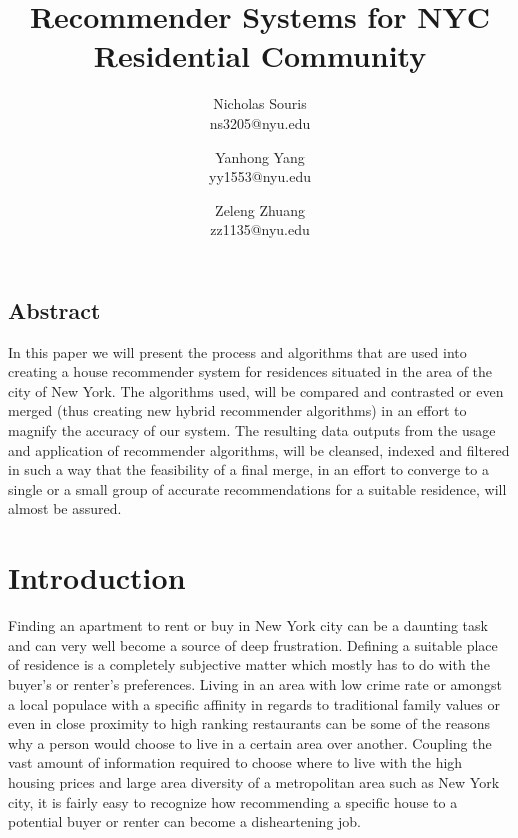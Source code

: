 \documentclass[letterpaper,twocolumn,10pt]{article}
\begin{document}
\date{}

\title{\Large \bf Recommender Systems for NYC Residential Community}

\author{
{\rm Nicholas Souris}\\
ns3205@nyu.edu
\and
{\rm Yanhong Yang}\\
yy1553@nyu.edu
 \and
 {\rm Zeleng Zhuang}\\
zz1135@nyu.edu
} %

\maketitle

\thispagestyle{empty}


\subsection*{Abstract}
In this paper we will  present the process and algorithms that are used into creating a house recommender system for residences situated in the area of the city of New York. The algorithms used, will be compared and contrasted or even merged (thus creating new hybrid recommender algorithms) in an effort to magnify the accuracy of our system. The resulting data outputs from the usage and application of recommender algorithms, will be cleansed, indexed and filtered in such a way that the feasibility of a final merge, in an effort to converge to a single or a small group of accurate recommendations for a suitable residence, will almost be assured.


\section{Introduction}

Finding an apartment to rent or buy in New York city can be a daunting task and can very well become a source of  deep frustration. Defining a suitable place of residence is a completely subjective matter which mostly has to do with the buyer's or renter's preferences. Living in an area with low crime rate or amongst a local populace with a specific affinity in regards to traditional family values or even in close proximity to high ranking restaurants can be some of the reasons why a person would choose  to live in a certain area over another. Coupling the vast amount of information required to choose where to live with the high housing prices and large area diversity  of a metropolitan area such as New York city, it is fairly easy to recognize how recommending a specific house to a potential buyer or renter can become a disheartening job. 
\end{document}
